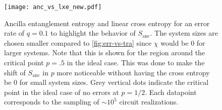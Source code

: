 %
%    
%
\begin{figure}[p]
  \centering
  \texttt{[image: anc\_vs\_lxe\_new.pdf]}
  \caption{Ancilla entanglement entropy and linear cross entropy for an error
  rate of $q=0.1$ to highlight the behavior of $S_\mathrm{anc}$. The system sizes are chosen smaller compared to
\cref{fig:err-vs-tra} since $\chi$ would be $0$ for larger systems. Note that
this is shown for the region around the critical point $p=.5$ in the ideal
case. This was done to make the shift of $S_\mathrm{anc}$ in $p$ more
noticeable without having the cross entropy be $0$ for small
system sizes. Grey vertical dots indicate the critical point in the ideal case
of no errors at $p = 1 /2$. Each datapoint corresponds to the sampling of $\sim
10^5$ circuit realizations.}
  \label{fig:large-q-anc-vs-lxe}
\end{figure}

